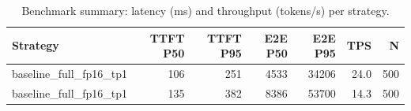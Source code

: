 \begin{table}
\caption{Benchmark summary: latency (ms) and throughput (tokens/s) per strategy.}
\label{tab:summary}
\begin{tabular}{lrrrrrr}
\toprule
Strategy & TTFT P50 & TTFT P95 & E2E P50 & E2E P95 & TPS & N \\
\midrule
baseline_full_fp16_tp1 & 106 & 251 & 4533 & 34206 & 24.0 & 500 \\
baseline_full_fp16_tp1 & 135 & 382 & 8386 & 53700 & 14.3 & 500 \\
\bottomrule
\end{tabular}
\end{table}
